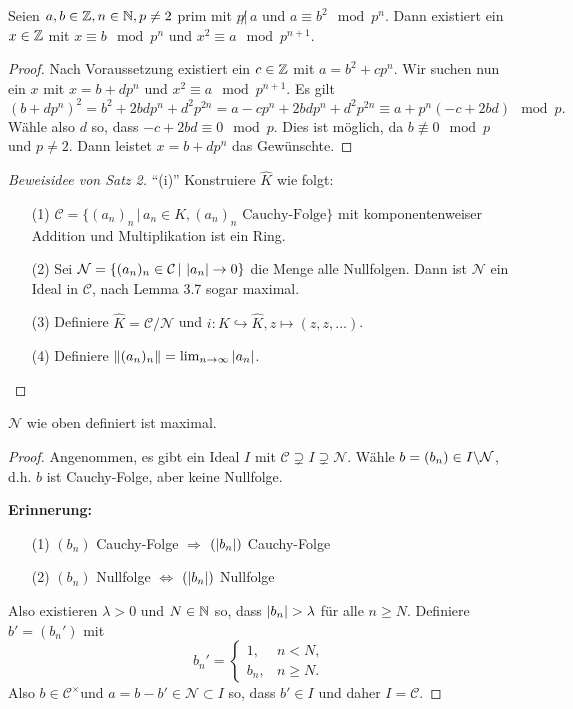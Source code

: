 \begin{Lem}
Seien $a,b \in\mathbb{Z}, n\in\mathbb{N},p\neq 2$ prim mit $p\not|\, a$ und $a\equiv b^2\mod p^n$.
Dann existiert ein $x\in\mathbb{Z}$ mit $x\equiv b\mod p^n$ und $x^2\equiv a\mod p^{n+1}$.
\end{Lem}

\begin{proof}
Nach Voraussetzung existiert ein $c\in\mathbb{Z}$ mit $a=b^2+cp^n$.
Wir suchen nun ein $x$ mit $x =b+dp^n$ und $x^2\equiv a\mod p^{n+1}$. Es gilt
\[ (b+dp^n)^2
= b^2+2bdp^n +d^2p^{2n}
= a-cp^n + 2bdp^n +d^2 p^{2n}
\equiv a+p^n (-c+2bd) \mod p.
\]
Wähle also $d$ so, dass $-c+2bd \equiv 0 \mod p$. Dies ist möglich, da $b\not\equiv 0 \mod p$ und $p\neq 2$. Dann leistet $x=b+dp^n$ das Gewünschte.
\end{proof}


\begin{proof}[Beweisidee von Satz 2]
\enquote{(i)} Konstruiere $\hat{K}$ wie folgt:
\begin{itemize}
\item[(1)] $\mathcal{C} = \{ (a_n)_n \, | \, a_n \in K, (a_n)_n \text{ Cauchy-Folge}\}$ mit komponentenweiser Addition und Multiplikation ist ein Ring.
\item[(2)] Sei $\mathcal{N} = \{ (a_n)_n \in \mathcal{C} \,|\, \left|{a_n}\right| \to 0 \}$
			die Menge alle Nullfolgen. Dann ist $\mathcal{N}$ ein Ideal in $\mathcal{C}$, nach Lemma 3.7 sogar maximal.
\item[(3)] Definiere $\hat{K} = \mathcal{C} / \mathcal{N}$ und $i \colon K \hookrightarrow \hat{K}, z \mapsto (z,z,\dots)$.
\item[(4)] Definiere $\left\|{(a_n)_n}\right\| = \lim_{n\to\infty} \left|{a_n}\right|$.
\end{itemize}
\end{proof}


\begin{Lem}
$\mathcal{N}$ wie oben definiert ist maximal.
\end{Lem}


\begin{proof}
Angenommen, es gibt ein Ideal $I$ mit $\mathcal{C} \supsetneq I \supsetneq \mathcal{N}$. Wähle 
$b=(b_n) \in I \backslash \mathcal{N}$, d.h. $b$ ist Cauchy-Folge, aber keine Nullfolge.

\bigskip
\textbf{Erinnerung:}
\begin{itemize}
\item[(1)] $(b_n)$ Cauchy-Folge $\Rightarrow$ $(\left|{b_n}\right|)$ Cauchy-Folge
\item[(2)] $(b_n)$ Nullfolge $\Leftrightarrow$ $(\left|{b_n}\right|)$ Nullfolge
\end{itemize}

Also existieren $\lambda>0$ und $N\in\mathbb{N}$ so, dass $\abs{b_n}> \lambda$ für alle $n\geq N$.
Definiere $b'= (b_n')$ mit 
\[ b_n' = \begin{cases}
1, &\mbox{} n<N, \\
b_n, &\mbox{} n \geq N.
\end{cases}
\]
Also $b \in \mathcal{C}^\times $und $a= b-b' \in \mathcal{N}\subset I$ so, dass $b' \in I$ und daher $I=\mathcal{C}$.
\end{proof}






